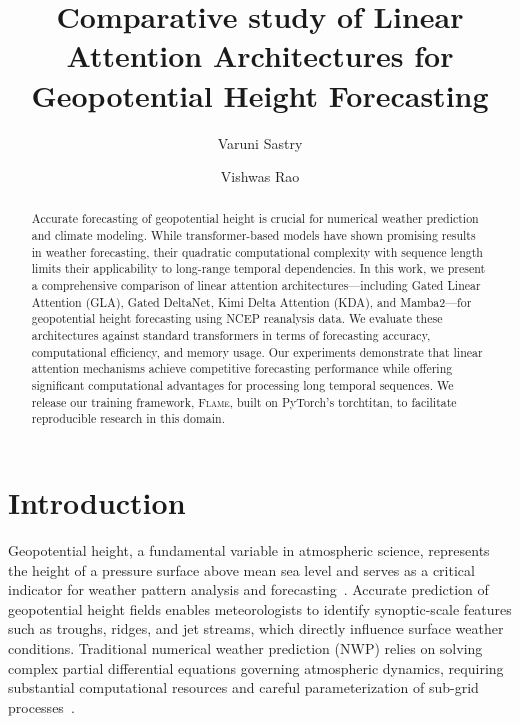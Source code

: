 \documentclass[runningheads]{llncs}
\newcommand{\method}{\textsc{Flame}}
\begin{document}
%
\title{Comparative study of Linear Attention Architectures for Geopotential Height Forecasting}
%
%
\author{Varuni Sastry \and
Vishwas Rao}
%
%
%
\maketitle
%
\begin{abstract}
Accurate forecasting of geopotential height is crucial for numerical weather prediction and climate modeling. While transformer-based models have shown promising results in weather forecasting, their quadratic computational complexity with sequence length limits their applicability to long-range temporal dependencies. In this work, we present a comprehensive comparison of linear attention architectures---including Gated Linear Attention (GLA), Gated DeltaNet, Kimi Delta Attention (KDA), and Mamba2---for geopotential height forecasting using NCEP reanalysis data. We evaluate these architectures against standard transformers in terms of forecasting accuracy, computational efficiency, and memory usage. Our experiments demonstrate that linear attention mechanisms achieve competitive forecasting performance while offering significant computational advantages for processing long temporal sequences. We release our training framework, \method{}, built on PyTorch's torchtitan, to facilitate reproducible research in this domain.

\end{abstract}

\section{Introduction}
\label{sec:introduction}

Geopotential height, a fundamental variable in atmospheric science, represents the height of a pressure surface above mean sea level and serves as a critical indicator for weather pattern analysis and forecasting~\cite{holton2013introduction}. Accurate prediction of geopotential height fields enables meteorologists to identify synoptic-scale features such as troughs, ridges, and jet streams, which directly influence surface weather conditions. Traditional numerical weather prediction (NWP) relies on solving complex partial differential equations governing atmospheric dynamics, requiring substantial computational resources and careful parameterization of sub-grid processes~\cite{bauer2015quiet}.
\end{document}
